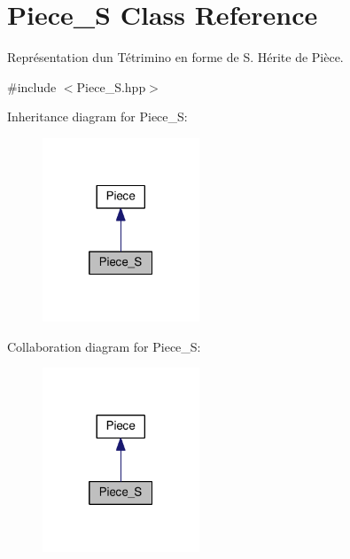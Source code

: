 \hypertarget{classPiece__S}{}\section{Piece\+\_\+S Class Reference}
\label{classPiece__S}


Représentation d\textquotesingle{}un Tétrimino en forme de S. Hérite de Pièce.  




{\ttfamily \#include $<$Piece\+\_\+\+S.\+hpp$>$}



Inheritance diagram for Piece\+\_\+S\+:
\nopagebreak
\begin{figure}[H]
\begin{center}
\leavevmode
\includegraphics[width=133pt]{classPiece__S__inherit__graph}
\end{center}
\end{figure}


Collaboration diagram for Piece\+\_\+S\+:
\nopagebreak
\begin{figure}[H]
\begin{center}
\leavevmode
\includegraphics[width=133pt]{classPiece__S__coll__graph}
\end{center}
\end{figure}

